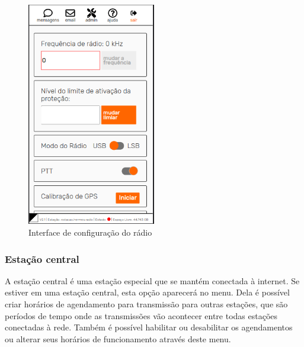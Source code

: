 \documentclass[11pt,a4paper]{article}
\begin{document}
\begin{figure}[H]
    \centering
    \includegraphics[width=0.5\textwidth]{screenshots/frontend/pt_kn/radioconfig2.png}
    \caption{Interface de configuração do rádio}
	\vspace{-10pt}
    \label{fig:radioconf2}
\end{figure}   

\subsubsection{Estação central} 
\label{gui_central_station}

A estação central é uma estação especial que se mantém conectada à internet. Se estiver em uma estação central, esta opção aparecerá no menu. Dela é possível criar horários de agendamento para transmissão para outras estações, que são períodos de tempo onde as transmissões vão acontecer entre todas estações conectadas à rede. Também é possível habilitar ou desabilitar os agendamentos ou alterar seus horários de funcionamento através deste menu.

\end{document}
